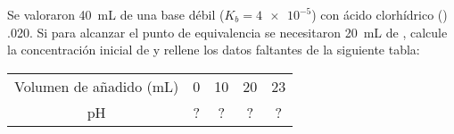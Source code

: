 Se valoraron \SI{40}{\milli\liter} de una base débil  ($K_b = \num{4e-5}$) con ácido clorhídrico () \SI{,020}{\Molar}. Si para alcanzar el punto de equivalencia se necesitaron \SI{20}{\milli\liter} de , calcule la concentración inicial de  y rellene los datos faltantes de la siguiente tabla:
\begin{center}
	\begin{tabular}{cSSSS}
		\toprule
			Volumen de  añadido (\si{\milli\liter})	&	0		&	10		&	20	&	23	\\
			pH												&	{?}		&	{?}		&	{?}	&	{?}	\\
		\bottomrule
	\end{tabular}
\end{center}
